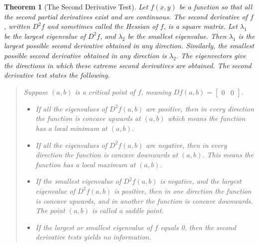 \documentclass[10pt,]{book}
\theoremstyle{plain}
\newtheorem{theorem}{Theorem}[section]
\theoremstyle{definition}
\theoremstyle{definition}
\theoremstyle{definition}
\theoremstyle{definition}
\theoremstyle{definition}
\numberwithin{equation}{section}
\newcommand{\amp}{&}
\begin{document}
\begin{theorem}[{The Second Derivative Test}]\label{theorem-8}
Let \(f(x,y)\) be a function so that all the second partial derivatives exist and are continuous. The second derivative of \(f\), written \(D^2f\) and sometimes called the Hessian of \(f\), is a square matrix. Let \(\lambda_1\) be the largest eigenvalue of \(D^2f\), and \(\lambda_2\) be the smallest eigenvalue. Then \(\lambda_1\) is the largest possible second derivative obtained in any direction. Similarly, the smallest possible second derivative obtained in any direction is \(\lambda_2\). The eigenvectors give the directions in which these extreme second derivatives are obtained. The second derivative test states the following.%
\begin{quote}\hypertarget{blockquote-8}{}
Suppose \((a,b)\) is a critical point of \(f\), meaning \(Df(a,b) = \begin{bmatrix}0\amp 0
\end{bmatrix}\). \leavevmode%
\begin{itemize}[label=\textbullet]
\item{}If all the eigenvalues of \(D^2f(a,b)\) are positive, then in every direction the function is concave upwards at \((a,b)\) which means the function has a local minimum at \((a,b)\).%
\item{}If all the eigenvalues of \(D^2f(a,b)\) are negative, then in every direction the function is concave downwards at \((a,b)\). This means the function has a local maximum at \((a,b)\).%
\item{}If the smallest eigenvalue of \(D^2f(a,b)\) is negative, and the largest eigenvalue of \(D^2f(a,b)\) is positive, then  in one direction the function is concave upwards, and in another the function is concave downwards. The point \((a,b)\) is called a saddle point.%
\item{}If the largest or smallest eigenvalue of \(f\) equals 0, then the second derivative tests yields no information.%
\end{itemize}
%
\end{quote}
\end{theorem}
\end{document}
